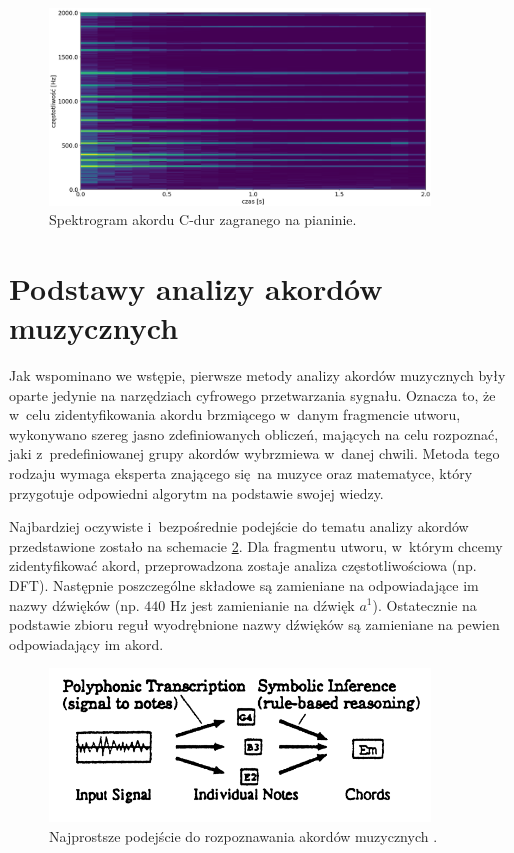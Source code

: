 \begin{figure}[htb]
    \centering
    \includegraphics[width=0.9\textwidth]{images/spektrogram_cdur}
    \caption{Spektrogram akordu C-dur zagranego na pianinie.}
    \label{fig:spektrogram_cdur}
\end{figure}



\section{Podstawy analizy akordów muzycznych}

Jak wspominano we wstępie, pierwsze metody analizy akordów muzycznych były oparte jedynie na narzędziach cyfrowego przetwarzania sygnału. Oznacza to, że w~celu zidentyfikowania akordu brzmiącego w~danym fragmencie utworu, wykonywano szereg jasno zdefiniowanych obliczeń, mających na celu rozpoznać, jaki z~predefiniowanej grupy akordów wybrzmiewa w~danej chwili. Metoda tego rodzaju wymaga eksperta znającego się na muzyce oraz matematyce, który przygotuje odpowiedni algorytm na podstawie swojej wiedzy.

Najbardziej oczywiste i~bezpośrednie podejście do tematu analizy akordów przedstawione zostało na schemacie \ref{fig:rozpoznawanie_stare_1}. Dla fragmentu utworu, w~którym chcemy zidentyfikować akord, przeprowadzona zostaje analiza częstotliwościowa (np. DFT). Następnie poszczególne składowe są zamieniane na odpowiadające im nazwy dźwięków (np. $440$ Hz jest zamienianie na dźwięk $a^1$). Ostatecznie na podstawie zbioru reguł wyodrębnione nazwy dźwięków są zamieniane na pewien odpowiadający im akord.

\begin{figure}[htb]
    \centering
    \includegraphics[width=0.9\textwidth]{images/rozpoznawanie_stare_1}
    \caption{Najprostsze podejście do rozpoznawania akordów muzycznych \cite{fujishima_realtime_1999}.}
    \label{fig:rozpoznawanie_stare_1}
\end{figure}

